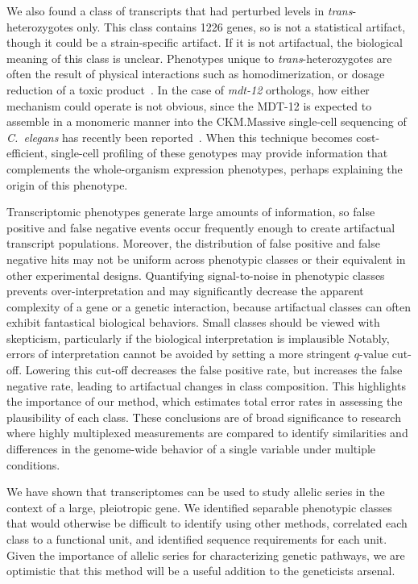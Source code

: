 \documentclass[8pt, twocolumn]{article}
\newcommand{\cel}{\emph{C.~elegans}}
\newcommand{\gene}[1]{\mbox{\emph{#1}}}
\newcommand{\protein}[1]{\mbox{\uppercase{#1}}}
\newcommand{\dpy}{\gene{mdt-12}}
\begin{document}
We also found a class of transcripts that had perturbed levels in
\emph{trans}-heterozygotes only. This class contains 1226 genes, so is not a
statistical artifact, though it could be a strain-specific artifact. If it is
not artifactual, the biological meaning of this class is unclear. Phenotypes
unique to \emph{trans}-heterozygotes are often the result of physical
interactions such as homodimerization, or dosage reduction of a toxic
product~\cite{Yook2005}. In the case of \dpy{} orthologs, how either mechanism
could operate is not obvious, since the \protein{mdt-12} is expected to assemble
in a monomeric manner into the CKM.\@ Massive single-cell sequencing of \cel{}
has recently been reported~\cite{Cao2017}. When this technique becomes
cost-efficient, single-cell profiling of these genotypes may provide information
that complements the whole-organism expression phenotypes, perhaps explaining
the origin of this phenotype.

Transcriptomic phenotypes generate large amounts of information, so false
positive and false negative events occur frequently enough to create artifactual
transcript populations. Moreover, the distribution of false positive and false
negative hits may not be uniform across phenotypic classes or their equivalent
in other experimental designs. Quantifying signal-to-noise in phenotypic classes
prevents over-interpretation and may significantly decrease the apparent
complexity of a gene or a genetic interaction, because artifactual classes can
often exhibit fantastical biological behaviors. Small classes should be viewed
with skepticism, particularly if the biological interpretation is implausible
Notably, errors of interpretation cannot be avoided by setting a more stringent
$q$-value cut-off. Lowering this cut-off decreases the false positive rate, but
increases the false negative rate, leading to artifactual changes in class
composition. This highlights the importance of our method, which estimates total
error rates in assessing the plausibility of each class.  These conclusions are
of broad significance to research where highly multiplexed measurements are
compared to identify similarities and differences in the genome-wide behavior of
a single variable under multiple conditions.

We have shown that transcriptomes can be used to study allelic series in the
context of a large, pleiotropic gene. We identified separable phenotypic classes
that would otherwise be difficult to identify using other methods, correlated
each class to a functional unit, and identified sequence requirements for each
unit. Given the importance of allelic series for characterizing genetic
pathways, we are optimistic that this method will be a useful addition to the
geneticists arsenal.
\end{document}
